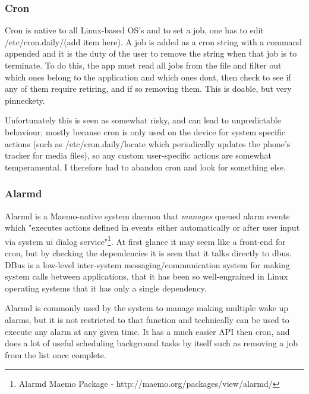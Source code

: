 \subsubsection{Cron}

Cron is native to all Linux-based OS's and to set a job, one has to edit /etc/cron.daily/(add item here).  A job is added as a cron string with a command appended and it is the duty of the user to remove the string when that job is to terminate. To do this, the app must read all jobs from the file and filter out which ones belong to the application and which ones dont, then check to see if any of them require retiring, and if so removing them. This is doable, but very pinneckety.

Unfortunately this is seen as somewhat risky, and can lead to unpredictable behaviour, mostly because cron is only used on the device for system specific actions (such as /etc/cron.daily/locate which periodically updates the phone's tracker for media files), so any custom user-specific actions are somewhat temperamental.  I therefore had to abandon cron and look for something else.

\subsubsection{Alarmd}
Alarmd is a Maemo-native system daemon that {\it manages} queued alarm events which "executes actions defined in events either automatically or after user input via system ui dialog service"\footnote{Alarmd Maemo Package - http://maemo.org/packages/view/alarmd/}\label{ref:alarmdpack}. At first glance it may seem like a front-end for cron, but by checking the dependencies it is seen that it talks directly to dbus. DBus is a low-level inter-system messaging/communication system for making system calls between applications, that it has been so well-engrained in Linux operating systems that it has only a single dependency.

Alarmd is commonly used by the system to manage making multiple wake up alarms, but it is not restricted to that function and technically can be used to execute any alarm at any given time. It has a much easier API then cron, and does a lot of useful scheduling background tasks by itself such as removing a job from the list once complete. 

